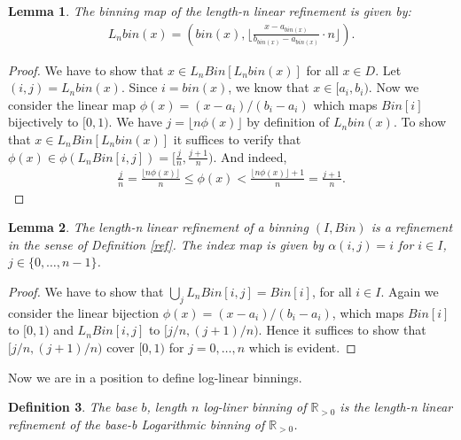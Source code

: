 \documentclass{article}
\theoremstyle{plain}
\newtheorem{definition}{Definition}[section]
\newtheorem{lemma}[definition]{Lemma}
\theoremstyle{remark}
\newcommand{\IR}{\mathbb{R}}
\newcommand{\Union}{\bigcup}
\newcommand{\floor}[1]{\lfloor#1\rfloor}
\begin{document}
\begin{lemma}
  The binning map of the length-n linear refinement is given by:
  \begin{align}\label{eq:lrefmap}
    L_nbin(x) = ( bin(x), \floor{\frac{x - a_{bin(x)}}{b_{bin(x)} - a_{bin(x)}} \cdot n } ).
  \end{align}
\end{lemma}

\begin{proof}
  We have to show that $x \in L_nBin[ L_nbin(x) ]$ for all $x \in D$.
  Let $(i,j) = L_nbin(x)$.
  Since $i = bin(x)$, we know that $x \in [a_i, b_i)$.
  Now we consider the linear map $\phi(x) = (x-a_i)/(b_i-a_i)$ which maps $Bin[i]$ bijectively to $[0,1)$.
  We have $j = \floor{ n \phi(x) }$ by definition of $L_nbin(x)$.
  To show that $x \in L_nBin[ L_nbin(x) ]$ it suffices to verify
  that $\phi(x) \in \phi(L_nBin[i,j]) = [ \frac{j}{n}, \frac{j+1}{n} )$.
  And indeed,
  \begin{align*}
    \frac{j}{n} = \frac{\floor{ n \phi(x) }}{n} \leq \phi(x) <
    \frac{\floor{ n \phi(x) } + 1 }{n} =  \frac{j+1}{n}.
  \end{align*}
\end{proof}

\begin{lemma}
  The length-n linear refinement of a binning $(I, Bin)$ is a refinement in the sense of Definition \ref{ref}.
  The index map is given by $\alpha(i,j) = i$ for $i \in I$, $j \in \{0,\dots,n-1\}$.
\end{lemma}

\begin{proof}
  We have to show that $\Union_{j} L_nBin[i,j] = Bin[i]$, for all $i \in I$.
  Again we consider the linear bijection $\phi(x) = (x-a_i)/(b_i-a_i)$, which maps $Bin[i]$ to $[0,1)$ and $L_nBin[i,j]$ to $[j/n, (j+1)/n)$.
  Hence it suffices to show that $[j/n, (j+1)/n)$ cover $[0,1)$ for $j=0,\dots,n$ which is evident.
\end{proof}

Now we are in a position to define log-linear binnings.

\begin{definition}\label{def:ll}
  The base $b$, length $n$ log-liner binning of $\IR_{>0}$ is the length-n linear refinement of the base-b Logarithmic binning of $\IR_{>0}$.
\end{definition}
\end{document}
